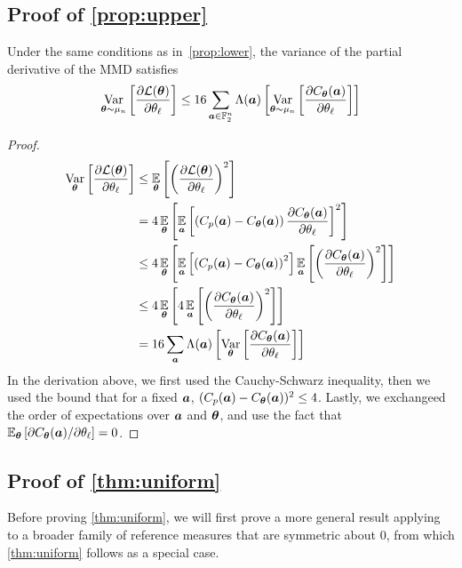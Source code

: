 \documentclass{article}
\theoremstyle{plain}
\theoremstyle{definition}
\theoremstyle{remark}
\begin{document}
\subsection{Proof of \cref{prop:upper}}
Under the same conditions as in~\cref{prop:lower}, the variance of the partial derivative of the MMD satisfies
\begin{equation*}
    \operatorname*{Var}_{{\bm{\theta}} \sim\mu_n} \left[ \frac{\partial \mathcal{L}({\bm{\theta}})}{\partial \theta_\ell} \right] \leq 16 \sum_{{\bm{a}}\in \mathbb{F}_2^n} \Lambda({\bm{a}})\left[  \operatorname*{Var}_{{\bm{\theta}}\sim\mu_n} \left[ \frac{\partial C_{\bm{\theta}}({\bm{a}})}{\partial \theta_\ell} \right]\right]
\end{equation*}
\begin{proof}
\begin{align*}
\operatorname*{Var}_{{\bm{\theta}}} \left[ \frac{\partial \mathcal{L}({\bm{\theta}})}{\partial \theta_\ell} \right] &\leq \operatorname*{\mathbb{E}}_{{\bm{\theta}}} \left[ \left(\frac{\partial \mathcal{L}({\bm{\theta}})}{\partial \theta_\ell} \right)^2 \right] \\
&= 4\operatorname*{\mathbb{E}}_{{\bm{\theta}}} \left[  \operatorname*{\mathbb{E}}_{{\bm{a}}}\left[\left( C_p({\bm{a}}) - C_{\bm{\theta}}({\bm{a}}) \right) \frac{\partial C_{\bm{\theta}}({\bm{a}})}{\partial \theta_\ell} \right]^2  \right]\\
&\leq 4\operatorname*{\mathbb{E}}_{{\bm{\theta}}} \left[  \operatorname*{\mathbb{E}}_{{\bm{a}}}\left[\left( C_p({\bm{a}}) - C_{\bm{\theta}}({\bm{a}}) \right)^2 \right] \operatorname*{\mathbb{E}}_{{\bm{a}}}\left[\left(\frac{\partial C_{\bm{\theta}}({\bm{a}})}{\partial \theta_\ell} \right)^2\right]\right]\\
&\leq 4\operatorname*{\mathbb{E}}_{{\bm{\theta}}} \left[  4 \operatorname*{\mathbb{E}}_{{\bm{a}}}\left[\left(\frac{\partial C_{\bm{\theta}}({\bm{a}})}{\partial \theta_\ell} \right)^2\right]\right]\\
&= 16 \sum_{\bm{a}} \Lambda({\bm{a}})\left[  \operatorname*{Var}_{{\bm{\theta}}} \left[ \frac{\partial C_{\bm{\theta}}({\bm{a}})}{\partial \theta_\ell} \right]\right]
\end{align*}
In the derivation above, we first used the Cauchy-Schwarz inequality, then we used the bound that for a fixed ${\bm{a}}$, $(C_p({\bm{a}}) - C_{\bm{\theta}}({\bm{a}}))^2 \leq 4$. Lastly, we exchangeed the order of expectations over ${\bm{a}}$ and ${\bm{\theta}}$, and use the fact that $\operatorname*{\mathbb{E}}_{{\bm{\theta}}}\left[\partial C_{\bm{\theta}}({\bm{a}}) / \partial \theta_\ell\right] = 0$.
\end{proof}


\subsection{Proof of \cref{thm:uniform}}
Before proving \cref{thm:uniform}, we will first prove a more general result applying to a broader family of reference measures that are symmetric about $0$, from which \cref{thm:uniform} follows as a special case.
\end{document}

